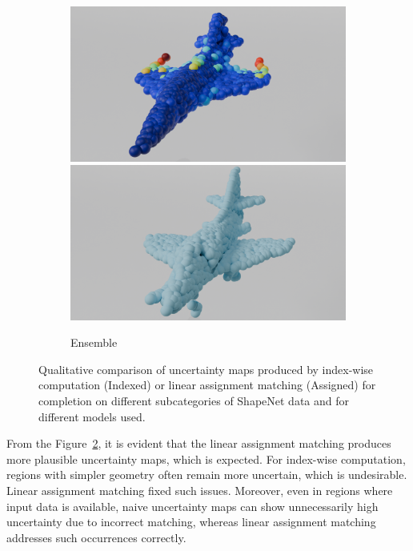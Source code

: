 \begin{figure}[htb]
\begin{subfigure}[t]{0.315\textwidth}
            \includegraphics[width=\textwidth]{figures/ens_lin_ap3.png}
            \includegraphics[width=\textwidth]{figures/com_ap3.png}
            \caption{Ensemble}\label{fig:matchingwar3}
          \end{subfigure}
          \caption{Qualitative comparison of uncertainty maps produced by index-wise computation (Indexed) or linear assignment matching (Assigned) for completion on different subcategories of ShapeNet data and for different models used.}
          \label{fig:matchingwar}
        \end{figure}
        \newline

        From the Figure~\ref{fig:matchingwar}, it is evident that the linear assignment matching produces more plausible uncertainty maps, which is expected. For index-wise computation, regions with simpler geometry often remain more uncertain, which is undesirable. Linear assignment matching fixed such issues. Moreover, even in regions where input data is available, naive uncertainty maps can show unnecessarily high uncertainty due to incorrect matching, whereas linear assignment matching addresses such occurrences correctly.

